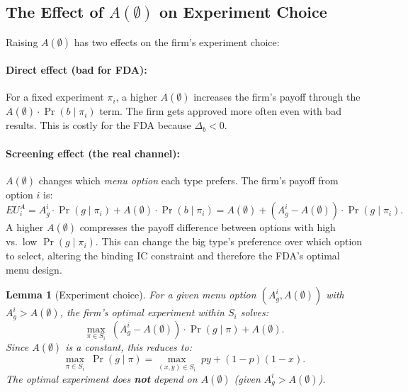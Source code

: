 \documentclass[12pt,a4paper]{article}
\newtheorem{lemma}{Lemma}
\begin{document}
\subsection{The Effect of $A(\emptyset)$ on Experiment Choice}

Raising $A(\emptyset)$ has two effects on the firm's
experiment choice:

\paragraph{Direct effect (bad for FDA):}
For a fixed experiment $\pi_i$, a higher $A(\emptyset)$
increases the firm's payoff through the $A(\emptyset) \cdot
\Pr(b \mid \pi_i)$ term. The firm gets approved more often
even with bad results. This is costly for the FDA because
$\Delta_b < 0$.

\paragraph{Screening effect (the real channel):}
$A(\emptyset)$ changes which \emph{menu option} each type
prefers. The firm's payoff from option $i$ is:
\[
  EU^A_i = A_g^i \cdot \Pr(g \mid \pi_i)
         + A(\emptyset) \cdot \Pr(b \mid \pi_i)
         = A(\emptyset)
           + (A_g^i - A(\emptyset)) \cdot \Pr(g \mid \pi_i).
\]
A higher $A(\emptyset)$ compresses the payoff difference
between options with high vs.\ low $\Pr(g \mid \pi_i)$. This
can change the big type's preference over which option to
select, altering the binding IC constraint and therefore the
FDA's optimal menu design.

\begin{lemma}[Experiment choice]\label{lem:exp_choice}
For a given menu option $(A_g^i, A(\emptyset))$ with
$A_g^i > A(\emptyset)$, the firm's optimal experiment within
$S_i$ solves:
\[
  \max_{\pi \in S_i} \; (A_g^i - A(\emptyset))
    \cdot \Pr(g \mid \pi) + A(\emptyset).
\]
Since $A(\emptyset)$ is a constant, this reduces to:
\[
  \max_{\pi \in S_i} \; \Pr(g \mid \pi)
  = \max_{(x,y) \in S_i} \; py + (1-p)(1-x).
\]
The optimal experiment does \textbf{not} depend on
$A(\emptyset)$ (given $A_g^i > A(\emptyset)$).
\end{lemma}
\end{document}
